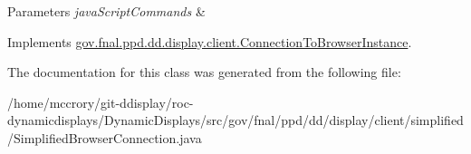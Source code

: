 \begin{DoxyParams}{Parameters}
{\em java\-Script\-Commands} & \\
\hline
\end{DoxyParams}


Implements \hyperlink{classgov_1_1fnal_1_1ppd_1_1dd_1_1display_1_1client_1_1ConnectionToBrowserInstance_ab58e70a2a6f47d1dc596f16fe33dedab}{gov.\-fnal.\-ppd.\-dd.\-display.\-client.\-Connection\-To\-Browser\-Instance}.



The documentation for this class was generated from the following file\-:\begin{DoxyCompactItemize}
\item 
/home/mccrory/git-\/ddisplay/roc-\/dynamicdisplays/\-Dynamic\-Displays/src/gov/fnal/ppd/dd/display/client/simplified/Simplified\-Browser\-Connection.\-java\end{DoxyCompactItemize}
